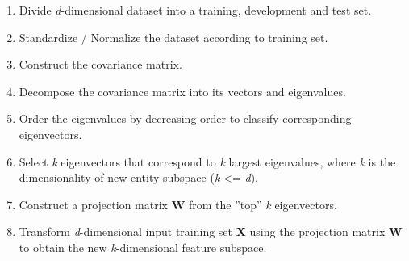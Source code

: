 \begin{enumerate}


\item Divide \textit{d}-dimensional dataset into a training, development and test set.
\item Standardize / Normalize the dataset according to training set.
\item Construct the covariance matrix.
\item Decompose the covariance matrix into its vectors and eigenvalues.
\item Order the eigenvalues by decreasing order to classify corresponding eigenvectors.
\item Select \textit{k} eigenvectors that correspond to \textit{k} largest eigenvalues, where \textit{k} is the dimensionality of new entity subspace (\textit{k} <= \textit{d}).
\item Construct a projection matrix \textbf{W} from the ''top'' \textit{k} eigenvectors.
\item Transform \textit{d}-dimensional input training set \textbf{X} using the projection matrix \textbf{W} to obtain the new \textit{k}-dimensional feature subspace.

\end{enumerate}

